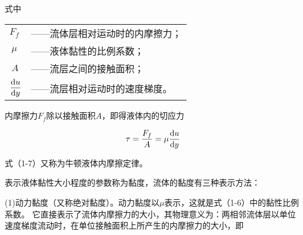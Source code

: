 \noindent 式中\quad %
\begin{tabular}[t]{p{1mm}l}
    $F_f$&——流体层相对运动时的内摩擦力；\\
    $\ \mu $&——液体黏性的比例系数；\\
    $\ A $&——流层之间的接触面积；\\
    $\displaystyle\frac{{\rm d}u}{{\rm d}y}$&——流层相对运动时的速度梯度。
\end{tabular}

内摩擦力$F_f$除以接触面积$A$，即得液体内的切应力

\begin{equation}
    \tau =\frac{F_f}{A}=\mu \frac{{\rm d}u}{{\rm d}y}
\end{equation}

\noindent 式（1-7）又称为牛顿液体内摩擦定律。

表示液体黏性大小程度的参数称为黏度，流体的黏度有三种表示方法：

(1)动力黏度（又称绝对黏度）。动力黏度以$\mu $表示，这就是式（1-6）中的黏性比例系数。
它直接表示了流体内摩擦力的大小，其物理意义为：两相邻流体层以单位速度梯度流动时，在单位接触面积上所产生的内摩擦力的大小，即